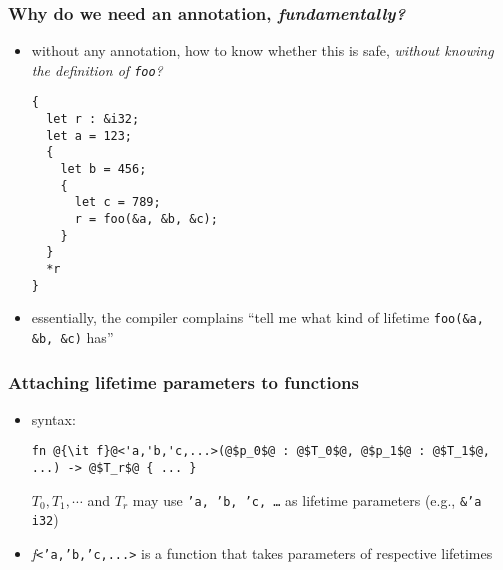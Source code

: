 \documentclass[12pt,dvipdfmx]{beamer}
\newcommand{\mura}[1]{{\color{purple}#1}}
\begin{document}
\begin{frame}[fragile]
  \frametitle{Why do we need an annotation, {\it fundamentally?}}
  \begin{itemize}
  \item without any annotation, how to know whether this is safe, \mura{\it without knowing
    the definition of {\tt foo}?}
\begin{lstlisting}
{      
  let r : &i32;      
  let a = 123;
  {      
    let b = 456;
    {      
      let c = 789;
      r = foo(&a, &b, &c);
    }
  }
  *r
}
\end{lstlisting}
\item essentially, the compiler complains
  ``tell me what kind of lifetime {\tt foo(\&a, \&b, \&c)} has''
  \end{itemize}
\end{frame}

\begin{frame}[fragile]
  \frametitle{Attaching lifetime parameters to functions}
  \begin{itemize}
  \item syntax:
\begin{lstlisting}
fn @{\it f}@<'a,'b,'c,...>(@$p_0$@ : @$T_0$@, @$p_1$@ : @$T_1$@, ...) -> @$T_r$@ { ... }
\end{lstlisting}
$T_0, T_1, \cdots$ and $T_r$ may use {\tt 'a, 'b, 'c, \ldots} as lifetime parameters
(e.g., {\tt \&'a i32})
\item {\it f}{\tt <'a,'b,'c,...>} is a function that takes parameters of respective
  lifetimes
  \end{itemize}
\end{frame}
\end{document}
